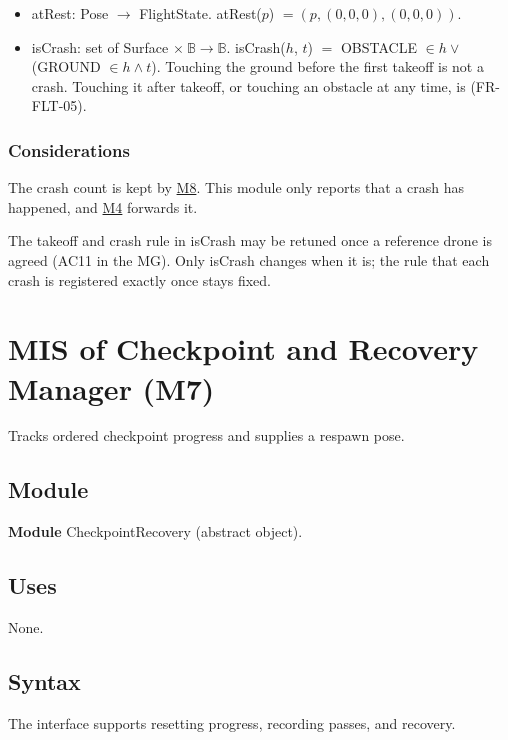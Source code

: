 \documentclass[12pt, titlepage]{article}
\newcommand{\Mref}[1]{\hyperref[sec:M#1]{M#1}}
\begin{document}
\begin{itemize}
\item atRest: Pose $\rightarrow$ FlightState. atRest($p$) $= (p, (0,0,0),
  (0,0,0))$.
\item isCrash: set of Surface $\times\ \mathbb{B} \rightarrow \mathbb{B}$.
  isCrash($h$, $t$) $=$ OBSTACLE $\in h \vee$ (GROUND $\in h \wedge t$).
  Touching the ground before the first takeoff is not a crash. Touching it
  after takeoff, or touching an obstacle at any time, is (FR-FLT-05).
\end{itemize}

\subsubsection{Considerations}

The crash count is kept by \Mref{8}. This module only reports that a crash has
happened, and \Mref{4} forwards it.

The takeoff and crash rule in isCrash may be retuned once a reference drone is
agreed (AC11 in the MG). Only isCrash changes when it is; the rule that each
crash is registered exactly once stays fixed.

\newpage
\section{MIS of Checkpoint and Recovery Manager (M7)} \label{sec:M7}

Tracks ordered checkpoint progress and supplies a respawn pose.

\subsection{Module}

\textbf{Module} CheckpointRecovery (abstract object).

\subsection{Uses}

None.

\subsection{Syntax}

The interface supports resetting progress, recording passes, and recovery.
\end{document}
